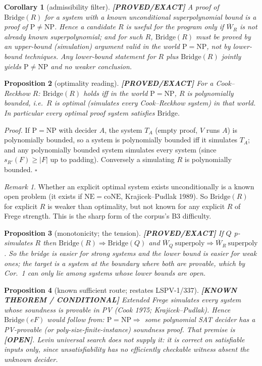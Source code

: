 \documentclass[11pt]{article}
\newtheorem{proposition}{Proposition}
\newtheorem{corollary}[proposition]{Corollary}
\theoremstyle{remark}
\newtheorem*{remark}{Remark}
\newcommand{\status}[1]{\textbf{[#1]}}
\newcommand{\Wb}{\overline W}
\begin{document}
\begin{corollary}[admissibility filter]\status{PROVED/EXACT}
A proof of $\mathrm{Bridge}(R)$ for a system with a known unconditional superpolynomial bound is a proof of $\mathrm P\neq\mathrm{NP}$. Hence a candidate $R$ is useful for the program only if $\Wb_R$ is \emph{not} already known superpolynomial; and for such $R$, $\mathrm{Bridge}(R)$ must be proved by an upper-bound (simulation) argument valid in the world $\mathrm P=\mathrm{NP}$, not by lower-bound techniques. Any lower-bound statement for $R$ plus $\mathrm{Bridge}(R)$ jointly yields $\mathrm P\ne\mathrm{NP}$ and no weaker conclusion.
\end{corollary}

\begin{proposition}[optimality reading]\status{PROVED/EXACT}
For a Cook--Reckhow $R$: $\mathrm{Bridge}(R)$ holds iff in the world $\mathrm P=\mathrm{NP}$, $R$ is polynomially bounded, i.e.\ $R$ is optimal (simulates every Cook--Reckhow system) in that world. In particular every optimal proof system satisfies $\mathrm{Bridge}$.
\end{proposition}
\emph{Proof.} If $\mathrm P=\mathrm{NP}$ with decider $A$, the system $T_A$ (empty proof, $V$ runs $A$) is polynomially bounded, so a system is polynomially bounded iff it simulates $T_A$; and any polynomially bounded system simulates every system (since $s_{R'}(F)\ge|F|$ up to padding). Conversely a simulating $R$ is polynomially bounded. $\square$
\begin{remark}
Whether an explicit optimal system exists unconditionally is a known open problem (it exists if $\mathrm{NE}=\mathrm{coNE}$, Krajicek--Pudlak 1989). So $\mathrm{Bridge}(R)$ for explicit $R$ is weaker than optimality, but not known for any explicit $R$ of Frege strength. This is the sharp form of the corpus's B3 difficulty.
\end{remark}

\begin{proposition}[monotonicity; the tension]\status{PROVED/EXACT}
If $Q$ p-simulates $R$ then $\mathrm{Bridge}(R)\Rightarrow\mathrm{Bridge}(Q)$ and $\Wb_Q\ \text{superpoly}\Rightarrow\Wb_R\ \text{superpoly}$. So the bridge is easier for strong systems and the lower bound is easier for weak ones; the target is a system at the boundary where both are provable, which by Cor.~1 can only lie among systems whose lower bounds are open.
\end{proposition}

\begin{proposition}[known sufficient route; restates LSPV-1/337]\status{KNOWN THEOREM / CONDITIONAL}
Extended Frege simulates every system whose soundness is provable in PV (Cook 1975; Krajicek--Pudlak). Hence $\mathrm{Bridge}(eF)$ would follow from: $\mathrm P=\mathrm{NP}\Rightarrow$ some polynomial SAT decider has a PV-provable (or poly-size-finite-instance) soundness proof. That premise is \status{OPEN}. Levin universal search does not supply it: it is correct on satisfiable inputs only, since unsatisfiability has no efficiently checkable witness absent the unknown decider.
\end{proposition}
\end{document}
